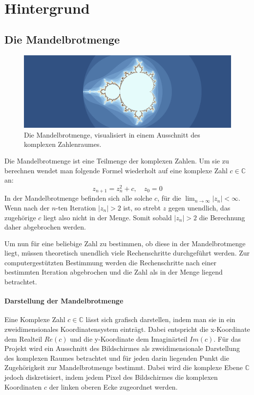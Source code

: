 \section{Hintergrund}

\subsection{Die Mandelbrotmenge}
\begin{figure}
	\centering
	\includegraphics[width=1\linewidth]{img/Einleitung/mandelbrot}
	\caption{Die Mandelbrotmenge, visualisiert in einem Ausschnitt des komplexen Zahlenraumes.}
	\label{fig:mandelbrot_visualisierung_beispiel}
\end{figure}
Die Mandelbrotmenge ist eine Teilmenge der komplexen Zahlen.
Um sie zu berechnen wendet man folgende Formel wiederholt auf eine komplexe Zahl $c \in \mathbb{C}$ an:
\begin{equation}\label{equ:mandelbrot}
	z_{n+1} = z_{n}^2 + c, \quad z_0 = 0
\end{equation}
In der Mandelbrotmenge befinden sich alle solche $c$, für die \( \lim_{n \rightarrow \infty} |z_n| < \infty \).
Wenn nach der \( n \)-ten Iteration \( |z_n| > 2 \) ist, so strebt $z$ gegen unendlich, das zugehörige $c$ liegt also nicht in der Menge.
Somit sobald $|z_n| > 2$ die Berechnung daher abgebrochen werden\cite{424331}.

Um nun für eine beliebige Zahl zu bestimmen, ob diese in der Mandelbrotmenge liegt, müssen
theoretisch unendlich viele Rechenschritte durchgeführt werden. Zur computergestützten Bestimmung
werden die Rechenschritte nach einer bestimmten Iteration abgebrochen und die Zahl als in der Menge liegend betrachtet.

\paragraph{Darstellung der Mandelbrotmenge}
Eine Komplexe Zahl \( c \in \mathbb{C} \) lässt sich grafisch darstellen, indem man sie in ein zweidimensionales Koordinatensystem einträgt.
Dabei entspricht die x-Koordinate dem Realteil \( Re(c) \) und die y-Koordinate dem Imaginärteil \( Im(c) \).
Für das Projekt wird ein Ausschnitt des Bildschirmes als zweidimensionale Darstellung des komplexen Raumes
betrachtet und für jeden darin liegenden Punkt die Zugehörigkeit zur Mandelbrotmenge bestimmt.
Dabei wird die komplexe Ebene \( \mathbb{C} \) jedoch diskretisiert, indem jedem Pixel des Bildschirmes die komplexen Koordinaten $c$
der linken oberen Ecke zugeordnet werden.

